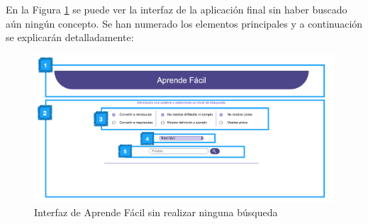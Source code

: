 En la Figura \ref{fig:paginaInicial} se puede ver la interfaz de la aplicación final sin haber buscado aún ningún concepto. Se han numerado los elementos principales y a continuación se explicarán detalladamente:

\begin{figure}[!h]
	\includegraphics[width=1.2\textwidth]{Imagenes/Bitmap/Capitulo4/Frontend/paginaInicial.png}
	\caption{Interfaz de Aprende Fácil  sin realizar ninguna búsqueda}
	\label{fig:paginaInicial}
\end{figure}


